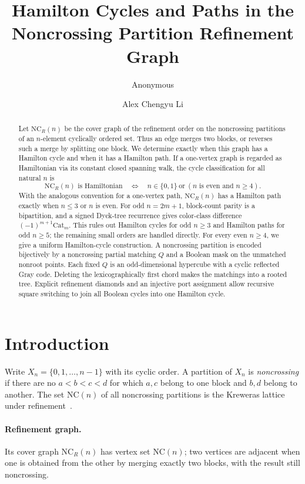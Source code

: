 \documentclass[12pt]{article}
\title{Hamilton Cycles and Paths in the Noncrossing Partition Refinement Graph}
\author{Anonymous}
\author{Alex Chengyu Li}
\makeatletter
\renewcommand{\maketitle}{\date{}\old@maketitle}
\newcommand{\NCR}{\mathrm{NC}_R}
\newcommand{\NC}{\mathrm{NC}}
\newcommand{\catalan}{\mathrm{Cat}}
\makeatother
\begin{document}
\maketitle

\begin{abstract}
Let $\NCR(n)$ be the cover graph of the refinement order on the
noncrossing partitions of an $n$-element cyclically ordered set.  Thus an
edge merges two blocks, or reverses such a merge by splitting one block.
We determine exactly when this graph has a Hamilton cycle and when it has a
Hamilton path.  If a one-vertex graph is regarded as Hamiltonian via its
constant closed spanning walk, the cycle classification for all natural $n$
is
\[
 \NCR(n)\text{ is Hamiltonian}
 \quad\Longleftrightarrow\quad
 n\in\{0,1\}\ \text{or}\ (n\text{ is even and }n\geq4).
\]
With the analogous convention for a one-vertex path, $\NCR(n)$ has a Hamilton
path exactly when $n\leq3$ or $n$ is even.  For odd $n=2m+1$, block-count
parity is a bipartition, and a signed Dyck-tree recurrence gives color-class
difference $(-1)^{m+1}\catalan_m$.  This rules out Hamilton cycles for odd
$n\geq3$ and Hamilton paths for odd $n\geq5$; the remaining small orders are
handled directly.  For every even $n\geq4$, we give a uniform Hamilton-cycle
construction.  A noncrossing partition is encoded bijectively by a
noncrossing partial matching $Q$ and a Boolean mask on the unmatched nonroot
points.  Each fixed $Q$ is an odd-dimensional hypercube with a cyclic
reflected Gray code.  Deleting the lexicographically first chord makes the
matchings into a rooted tree.  Explicit refinement diamonds and an injective
port assignment allow recursive square switching to join all Boolean cycles
into one Hamilton cycle.
\end{abstract}

\section{Introduction}

Write $X_n=\{0,1,\ldots,n-1\}$ with its cyclic order.  A partition of
$X_n$ is \emph{noncrossing} if there are no $a<b<c<d$ for which $a,c$
belong to one block and $b,d$ belong to another.  The set $\NC(n)$ of all
noncrossing partitions is the Kreweras lattice under refinement~\cite{K,S,SU}.
\paragraph{Refinement graph.}\label{def:refinement-graph}
Its cover graph $\NCR(n)$ has vertex set $\NC(n)$; two vertices are adjacent
when one is obtained from the other by merging exactly two blocks, with the
result still noncrossing.
\end{document}

